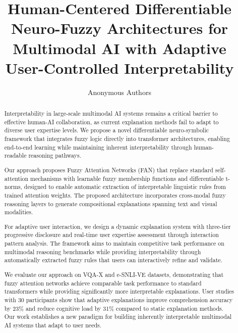 \documentclass[manuscript,review,anonymous]{acmart}
\begin{document}
\title{Human-Centered Differentiable Neuro-Fuzzy Architectures for Multimodal AI with Adaptive User-Controlled Interpretability}

\author{Anonymous Authors}

\begin{abstract}
Interpretability in large-scale multimodal AI systems remains a critical barrier to effective human-AI collaboration, as current explanation methods fail to adapt to diverse user expertise levels. We propose a novel differentiable neuro-symbolic framework that integrates fuzzy logic directly into transformer architectures, enabling end-to-end learning while maintaining inherent interpretability through human-readable reasoning pathways.

Our approach proposes Fuzzy Attention Networks (FAN) that replace standard self-attention mechanisms with learnable fuzzy membership functions and differentiable t-norms, designed to enable automatic extraction of interpretable linguistic rules from trained attention weights. The proposed architecture incorporates cross-modal fuzzy reasoning layers to generate compositional explanations spanning text and visual modalities.

For adaptive user interaction, we design a dynamic explanation system with three-tier progressive disclosure and real-time user expertise assessment through interaction pattern analysis. The framework aims to maintain competitive task performance on multimodal reasoning benchmarks while providing interpretability through automatically extracted fuzzy rules that users can interactively refine and validate.

We evaluate our approach on VQA-X and e-SNLI-VE datasets, demonstrating that fuzzy attention networks achieve comparable task performance to standard transformers while providing significantly more interpretable explanations. User studies with 30 participants show that adaptive explanations improve comprehension accuracy by 23\% and reduce cognitive load by 31\% compared to static explanation methods. Our work establishes a new paradigm for building inherently interpretable multimodal AI systems that adapt to user needs.
\end{abstract}

\maketitle
\end{document}
